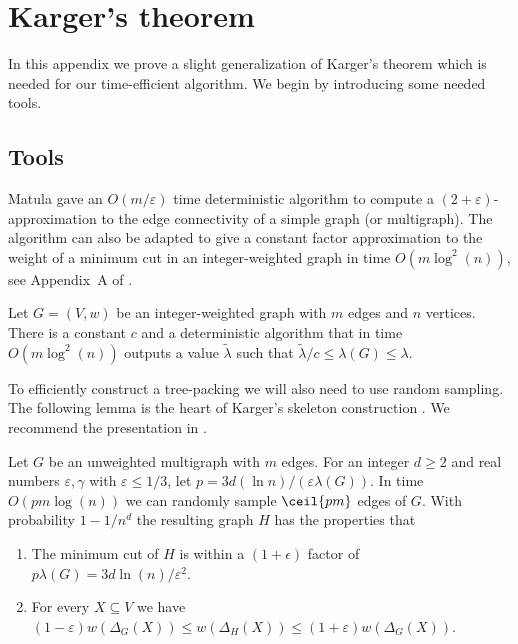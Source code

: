 \setcounter{theorem}{40}
\appendix
\section{Karger's theorem}
\label{app:karger}
In this appendix we prove a slight generalization of Karger's theorem \cite[Theorem 4.1]{Karger00} which is needed for our time-efficient algorithm.  
We begin by introducing some needed tools.

\subsection{Tools}
Matula \cite{Mat93} gave an $O(m/\varepsilon)$ time deterministic algorithm to compute a $(2+\varepsilon)$-approximation to the edge connectivity of a simple graph (or multigraph).  
The algorithm can also be adapted to give a constant factor approximation to the weight of a minimum cut in an integer-weighted graph in time $O(m \log^2(n))$, see Appendix~A of \cite{GMW20}.
\begin{lemma}
\label{lem:matula}
Let $G = (V,w)$ be an integer-weighted graph with $m$ edges and $n$ vertices.  There is a constant $c$ and a deterministic algorithm that in time $O(m \log^2(n))$
outputs a value $\tilde \lambda$ such that $\tilde \lambda/c \le \lambda(G) \le  \lambda$.
\end{lemma}

To efficiently construct a tree-packing we will also need to use random sampling.  The following lemma is the heart of Karger's skeleton construction \cite{Karger99}.  We recommend 
the presentation in \cite[Lemma 14]{BLS20}.
\begin{lemma}
\label{lem:downsample}
Let $G$ be an unweighted multigraph with $m$ edges.  For an integer $d \ge 2$ and real numbers $\varepsilon, \gamma$ with $\varepsilon \le 1/3$, 
let $p = 3d(\ln n)/(\varepsilon \lambda(G))$.  In time $O(pm \log(n))$  we can randomly sample $\ceil{pm}$ edges of $G$.  With probability $1-1/n^d$ the resulting graph $H$ has the properties that
\begin{enumerate}
  \item The minimum cut of $H$ is within a $(1+\epsilon)$ factor of $p\lambda(G) = 3d\ln(n)/\varepsilon^2$.
  \item For every $X \subseteq V$ we have $(1-\varepsilon) w(\Delta_G(X)) \le w(\Delta_H(X)) \le (1+\varepsilon) w(\Delta_G(X))$.
\end{enumerate}
\end{lemma}

